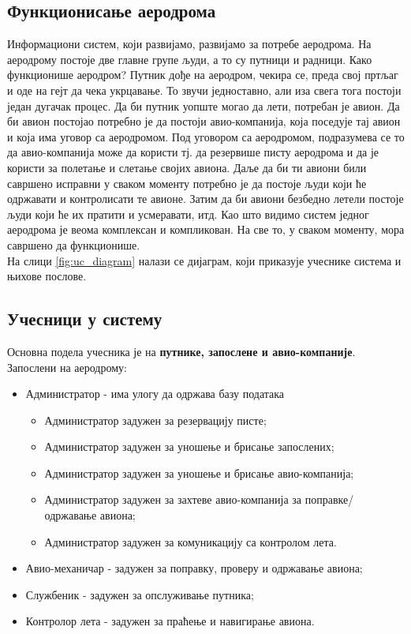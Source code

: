 \documentclass{article}
\begin{document}
\subsection{Функционисање аеродрома}
Информациони систем, који развијамо, развијамо за потребе аеродрома. На аеродрому постоје две главне групе људи, а то су путници и радници. Како функционише аеродром? Путник дође на аеродром, чекира се, преда свој пртљаг и оде на гејт да чека укрцавање. То звучи једноставно, али иза свега тога постоји један дугачак процес. Да би путник уопште могао да лети, потребан је авион. Да би авион постојао потребно је да постоји авио-компанија, која поседује тај авион и која има уговор са аеродромом. Под уговором са аеродромом, подразумева се то да авио-компанија може да користи тј. да резервише писту аеродрома и да је користи за полетање и слетање својих авиона. Даље да би ти авиони били савршено исправни у сваком моменту потребно је да постоје људи који ће одржавати и контролисати те авионе. Затим да би авиони безбедно летели постоје људи који ће их пратити и усмеравати, итд. Као што видимо систем једног аеродрома је веома комплексан и компликован. На све то, у сваком моменту, мора савршено да функционише. \\
    На слици \ref{fig:uc_diagram} налази се дијаграм, који приказује учеснике система и њихове 
    послове.

\subsection{Учесници у систему}
Основна подела учесника је на \textbf{путнике, запослене и авио-компаније}.\\
Запослени на аеродрому:
\begin{itemize}
    \item Администратор - има улогу да одржава базу података
        \begin{itemize}
            \item \small{Администратор задужен за резервацију писте;}
            \item Администратор задужен за уношење и брисање запослених;
            \item Администратор задужен за уношење и брисање авио-компанија;
            \item Администратор задужен за захтеве авио-компанија за поправке/одржавање авиона;
            \item Администратор задужен за комуникацију са контролом лета.
        \end{itemize}
    \item Авио-механичар - задужен за поправку, проверу и одржавање авиона;
    \item Службеник - задужен за опслуживање путника;
    \item Контролор лета - задужен за праћење и навигирање авиона.
\end{itemize}
\end{document}
